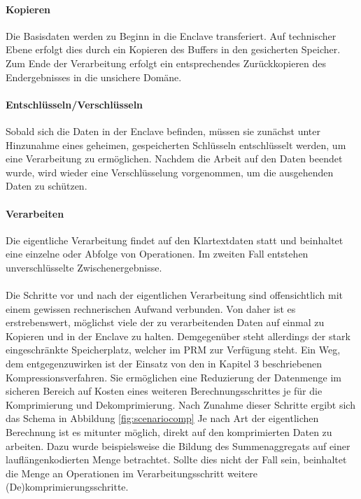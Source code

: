 \paragraph{Kopieren}
Die Basisdaten werden zu Beginn in die Enclave transferiert. Auf technischer Ebene erfolgt dies durch ein Kopieren des Buffers in den gesicherten Speicher. Zum Ende der Verarbeitung erfolgt ein entsprechendes Zurückkopieren des Endergebnisses in die unsichere Domäne.

\paragraph{Entschlüsseln/Verschlüsseln}
Sobald sich die Daten in der Enclave befinden, müssen sie zunächst unter Hinzunahme eines geheimen, gespeicherten Schlüsseln entschlüsselt werden, um eine Verarbeitung zu ermöglichen. Nachdem die Arbeit auf den Daten beendet wurde, wird wieder eine Verschlüsselung vorgenommen, um die ausgehenden Daten zu schützen.

\paragraph{Verarbeiten}
Die eigentliche Verarbeitung findet auf den Klartextdaten statt und beinhaltet eine einzelne oder Abfolge von Operationen. Im zweiten Fall entstehen unverschlüsselte Zwischenergebnisse.

\paragraph{}
Die Schritte vor und nach der eigentlichen Verarbeitung sind offensichtlich mit einem gewissen rechnerischen Aufwand verbunden. Von daher ist es erstrebenswert, möglichst viele der zu verarbeitenden Daten auf einmal zu Kopieren und in der Enclave zu halten. Demgegenüber steht allerdings der stark eingeschränkte Speicherplatz, welcher im PRM zur Verfügung steht. Ein Weg, dem entgegenzuwirken ist der Einsatz von den in Kapitel 3 beschriebenen Kompressionsverfahren. Sie ermöglichen eine Reduzierung der Datenmenge im sicheren Bereich auf Kosten eines weiteren Berechnungsschrittes je für die Komprimierung und Dekomprimierung. Nach Zunahme dieser Schritte ergibt sich das Schema in Abbildung \ref{fig:scenariocomp} Je nach Art der eigentlichen Berechnung ist es mitunter möglich, direkt auf den komprimierten Daten zu arbeiten. Dazu wurde beispielsweise die Bildung des Summenaggregats auf einer lauflängenkodierten Menge betrachtet. Sollte dies nicht der Fall sein, beinhaltet die Menge an Operationen im Verarbeitungsschritt weitere (De)komprimierungsschritte.

